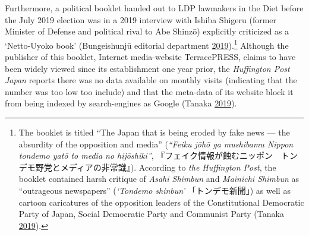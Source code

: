 \documentclass[10pt,british,A4paper,,openany]{memoir}
\begin{document}
Furthermore, a political booklet handed out to LDP lawmakers in the Diet
before the July 2019 election was in a 2019 interview with Ishiba
Shigeru (former Minister of Defense and political rival to Abe Shinzō)
explicitly criticized as a `Netto-Uyoko book' (Bungeishunjū editorial
department
\protect\hyperlink{ref-bungeishunju_editorial_department_eng._2019}{2019}).\footnote{The
  booklet is titled ``The Japan that is being eroded by fake news ---
  the absurdity of the opposition and media'' (\emph{``Feiku jōhō ga
  mushibamu Nippon tondemo yatō to media no hijōshiki''},
  『フェイク情報が蝕むニッポン　トンデモ野党とメディアの非常識』).
  According to \emph{the Huffington Post}, the booklet contained harsh
  critique of \emph{Asahi Shimbun} and \emph{Mainichi Shimbun} as
  ``outrageous newspapers'' (\emph{`Tondemo shinbun'} 「トンデモ新聞」)
  as well as cartoon caricatures of the opposition leaders of the
  Constitutional Democratic Party of Japan, Social Democratic Party and
  Communist Party (Tanaka
  \protect\hyperlink{ref-tanaka_eng._2019}{2019}).} Although the
publisher of this booklet, Internet media-website TerracePRESS, claims
to have been widely viewed since its establishment one year prior, the
\emph{Huffington Post Japan} reports there was no data available on
monthly visits (indicating that the number was too low too include) and
that the meta-data of its website block it from being indexed by
search-engines as Google (Tanaka
\protect\hyperlink{ref-tanaka_eng._2019}{2019}).
\end{document}
